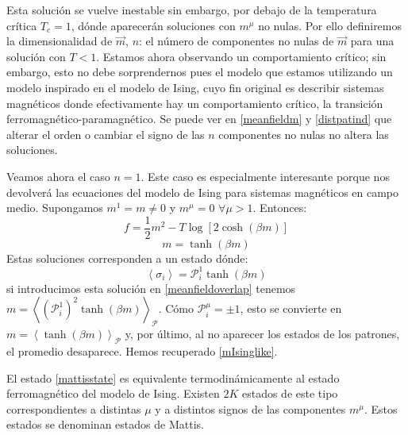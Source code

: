 \documentclass[titlepage,12pt]{article}
\numberwithin{equation}{section}
\begin{document}
	Esta solución se vuelve inestable sin embargo, por debajo de la temperatura crítica $T_c=1$, dónde aparecerán soluciones con $m^\mu$ no nulas. Por ello definiremos la dimensionalidad de $\vec{m}$, $n$: el número de componentes no nulas de $\vec{m}$ para una solución con $T<1$. Estamos ahora observando un comportamiento crítico; sin embargo, esto no debe sorprendernos pues el modelo que estamos utilizando un modelo inspirado en el modelo de Ising, cuyo fin original es describir sistemas magnéticos donde efectivamente hay un comportamiento crítico, la transición ferromagnético-paramagnético. Se puede ver en \eqref{meanfieldm} y \eqref{distpatind} que alterar el orden o cambiar el signo de las $n$ componentes no nulas no altera las soluciones.
	
	Veamos ahora el caso $n=1$. Este caso es especialmente interesante porque nos devolverá las ecuaciones del modelo de Ising para sistemas magnéticos en campo medio. Supongamos $m^1=m\neq0$ y $m^\mu = 0\,\,\forall \mu>1$. Entonces:
	\begin{equation}
	f=\frac{1}{2}m^2 - T\log\left[2\cosh(\beta m)\right]
	\label{fIsinglike}
	\end{equation}
	\begin{equation}
	m=\tanh(\beta m)
	\label{mIsinglike}
	\end{equation}
	Estas soluciones corresponden a un estado dónde:
	\begin{equation}
	\left<\sigma_i\right>=\mathcal{P}_i^1\tanh(\beta m)
	\label{mattisstate}
	\end{equation}
	si introducimos esta solución en \eqref{meanfieldoverlap} tenemos $m=\left<(\mathcal{P}_i^1)^2\tanh(\beta m)\right>_{\mathcal{P}}$. Cómo $\mathcal{P}^\mu_i=\pm 1$, esto se convierte en $m=\left<\tanh(\beta m)\right>_{\mathcal{P}}$ y, por último, al no aparecer los estados de los patrones, el promedio desaparece. Hemos recuperado \eqref{mIsinglike}. 
	
	El estado \eqref{mattisstate} es equivalente termodinámicamente al estado ferromagnético del modelo de Ising. Existen $2K$ estados de este tipo correspondientes a distintas $\mu$ y a distintos signos de las componentes $m^\mu$. Estos estados se denominan estados de Mattis.
	\\
	
\end{document}
